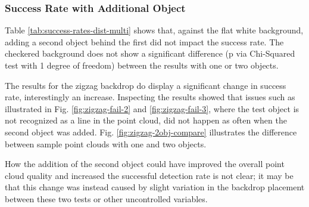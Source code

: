 \subsubsection{Success Rate with Additional Object}

Table \ref{tab:success-rates-dist-multi} shows that, against the flat white background, adding a second object behind the first did not
impact the success rate. The checkered background does not show a significant difference (p  via Chi-Squared test with 1 degree of freedom)
between the results with one or two objects. 

The results for the zigzag backdrop do display a significant change in success rate, interestingly an increase. 
Inspecting the results showed that issues such as illustrated in Fig. \ref{fig:zigzag-fail-2} and \ref{fig:zigzag-fail-3},
where the test object is not recognized as a line in the point cloud, did not happen as often when the second object was added.
Fig. \ref{fig:zigzag-2obj-compare} illustrates the difference between sample point clouds with one and two objects. 

How the addition of the second object could have improved the overall point cloud quality and increased the successful 
detection rate is not clear; it may be that this change was instead caused by slight variation in the backdrop placement
between these two tests or other uncontrolled variables.


